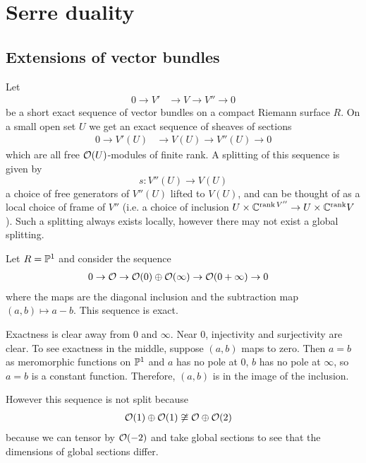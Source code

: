 \documentclass[12pt]{article}
\begin{document}
\section{Serre duality}
\subsection{Extensions of vector bundles}
Let \begin{align*}
    0 \to V' & \to V \to V'' \to 0
\end{align*} be a short exact sequence of vector bundles on a compact Riemann surface $R$. On a small open set $U$ we get an exact sequence of sheaves of sections \begin{align*}
    0 \to V'(U) & \to V(U) \to V''(U) \to 0
\end{align*} which are all free $\cO(U)$-modules of finite rank. A splitting of this sequence is given by \[s: V''(U) \to V(U)\] a choice of free generators of $V''(U)$ lifted to $V(U)$, and can be thought of as a local choice of frame of $V''$ (i.e. a choice of inclusion $U\times \C^{\operatorname{rank} V''} \to U\times \C^{\operatorname{rank} }V$). Such a splitting always exists locally, however there may not exist a global splitting.

\begin{example}
    Let $R = \P^1$ and consider the sequence \begin{align*}
        0 \to \cO \to \cO(0) \oplus \cO(\infty) & \to \cO(0 + \infty) \to 0
    \end{align*} where the maps are the diagonal inclusion and the subtraction map $(a,b) \mapsto a-b$. This sequence is exact.

    Exactness is clear away from $0$ and $\infty$. Near $0$, injectivity and surjectivity are clear. To see exactness in the middle, suppose $(a,b)$ maps to zero. Then $a=b$ as meromorphic functions on $\P^1$ and $a$ has no pole at $0$, $b$ has no pole at $\infty$, so $a=b$ is a constant function. Therefore, $(a,b)$ is in the image of the inclusion.

    However this sequence is not split because \begin{align*}
        \cO (1) \oplus \cO(1) & \not\cong \cO \oplus \cO(2)
    \end{align*} because we can tensor by $\cO(-2)$ and take global sections to see that the dimensions of global sections differ.
\end{example}
\end{document}
